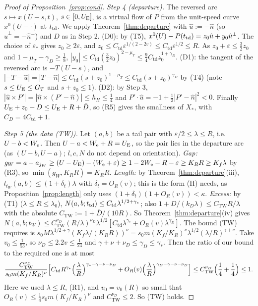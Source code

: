 \begin{proof}[Proof of Proposition~\ref{prop:cond}]
\emph{Step 4 (departure).} The reversed arc $s\mapsto x(U-s,t)$, $s\in[0,U_{\mathrm{E}}]$, is a virtual flow of $P$ from the
unit-speed curve $x^0(U-\cdot)$ at $t_{\mathrm{td}}$. We apply Theorem~\ref{thm:departure} with $\hat u:=-\hat n$ (so
$\hat u^\perp=-\hat n^\perp$) and $D$ as in Step 2.
(D0): by (T5), $x^0(U)-P(t_{\mathrm{td}})=z_0\hat u+y_0\hat u^\perp$. The choice of $\varepsilon_*$ gives $z_0\ge2\varepsilon$, and
$z_0\le C_{\mathrm{td}}\varepsilon^{1/(2-2v)}\le C_{\mathrm{td}}\varepsilon^{1/2}\le R$. As $z_0+\varepsilon\le\frac32z_0$ and
$1-\mu_T-\gamma_D\ge\frac18$, $|y_0|\le C_{\mathrm{td}}(\frac32z_0)^{2-\mu_T}\le\frac94C_{\mathrm{td}}z_0^{1+\gamma_D}$.
(D1): the tangent of the reversed arc is $-T(U-s)$, and $|-T-\hat u|=|T-\hat n|\le C_{\mathrm{td}}(s+z_0)^{1-\mu_T}\le
C_{\mathrm{td}}(s+z_0)^{\gamma_D}$ by (T4) (note $s\le U_{\mathrm{E}}\le G_T$ and $s+z_0\le1$).
(D2): by Step 3, $|\hat u\times P'|=|\hat n\times(P'-\hat n)|\le h_H\le\frac14$ and
$P'\cdot\hat u=-1+\frac12|P'-\hat n|^2<0$.
Finally $U_{\mathrm{E}}+z_0+D\le U_{\mathrm{E}}+R+\bar D$, so (R5) gives the smallness of $X_*$, with $C_D=4C_{\mathrm{td}}+1$.

\emph{Step 5 (the data (TW)).} Let $(a,b)$ be a tail pair with $\varepsilon/2\le\lambda\le R$, i.e.\ $U-b<W_{\mathrm{e}}$. Then
$U-a<W_{\mathrm{e}}+R=U_{\mathrm{E}}$, so the pair lies in the departure arc (as $(U-b,U-a)$; $l,c,N$ do not depend on orientation).
\emph{Gap:} $g_W=a-a_{j_W}\ge(U-U_{\mathrm{E}})-(W_{\mathrm{e}}+\varepsilon)\ge1-2W_{\mathrm{e}}-R-\varepsilon\ge K_RR\ge K_f\lambda$ by (R3), so
$\min(g_W,K_RR)=K_RR$. \emph{Length:} by Theorem~\ref{thm:departure}(iii), $l_{t_W}(a,b)\le(1+\delta_t)\lambda$ with
$\delta_t=O_R(v)$; this is the form (H) needs, as Proposition~\ref{prop:length} only uses $(1+\delta_t)(1+O_R(v))<\kappa$.
\emph{Excess:} by (T1) ($\lambda\le R\le\lambda_0$), $N(a,b;t_{\mathrm{td}})\le C_{\mathrm{td}}\lambda^{1/2+\gamma_*}$; also
$1+D/(k_D\lambda)\le C_{\mathrm{TW}}R/\lambda$ with the absolute $C_{\mathrm{TW}}:=1+\bar D/(10R)$. So Theorem~\ref{thm:departure}(iv) gives
$N(a,b;t_W)\le C_{\mathrm{TW}}^{\nu_D}(R/\lambda)^{\nu_D}\lambda^{1/2}[C_{\mathrm{td}}\lambda^{\gamma_*}+O_R(v)\lambda^{\gamma_D}]$.
The bound (TW) requires is $s_0M\lambda^{1/2+\gamma}(K_f\lambda/(K_RR))^\nu=s_0m(K_f/K_R)^\nu\lambda^{1/2}(\lambda/R)^{\gamma+\nu}$.
Take $v_0\le\frac1{53}$, so $\nu_D\le2.2v\le\frac1{24}$ and $\gamma+\nu+\nu_D\le\gamma_D\le \gamma_*$. Then the ratio of our
bound to the required one is at most
\[
\frac{C_{\mathrm{TW}}^{\nu_D}}{s_0m(K_f/K_R)^\nu}\Bigl[C_{\mathrm{td}}R^{\gamma_*}\Bigl(\frac\lambda R\Bigr)^{\gamma_*-\gamma-\nu-\nu_D}
+O_R(v)\Bigl(\frac\lambda R\Bigr)^{\gamma_D-\gamma-\nu-\nu_D}\Bigr]\le C_{\mathrm{TW}}^{\nu_D}\Bigl(\frac14+\frac14\Bigr)\le1 .
\]
Here we used $\lambda\le R$, (R1), and $v_0=v_0(R)$ so small that $O_R(v)\le\frac14s_0m(K_f/K_R)^\nu$ and $C_{\mathrm{TW}}^{\nu_D}\le2$.
So (TW) holds.


\end{proof}
